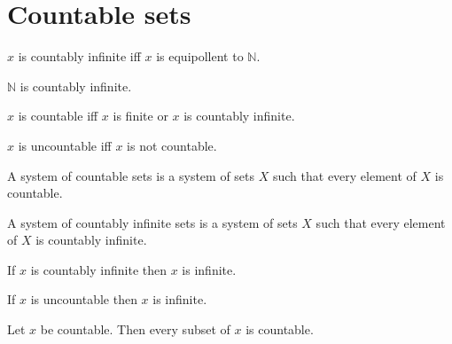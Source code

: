 \documentclass[../../basic-notions.ftl.tex]{subfiles}
\begin{document}


  \section{Countable sets}

  \begin{forthel}
    \begin{definition}
      $x$ is countably infinite iff $x$ is equipollent to $\mathbb{N}$.
    \end{definition}

    \begin{proposition}
      $\mathbb{N}$ is countably infinite.
    \end{proposition}

    \begin{definition}
      $x$ is countable iff $x$ is finite or $x$ is countably infinite.
    \end{definition}

    \begin{definition}
      $x$ is uncountable iff $x$ is not countable.
    \end{definition}

    \begin{definition}
      A system of countable sets is a system of sets $X$ such that every element of $X$ is countable.
    \end{definition}

    \begin{definition}
      A system of countably infinite sets is a system of sets $X$ such that every element of $X$ is countably infinite.
    \end{definition}

    \begin{proposition}[6064894556241920]
      If $x$ is countably infinite then $x$ is infinite.
    \end{proposition}

    \begin{proposition}[4210470751830016]
      If $x$ is uncountable then $x$ is infinite.
    \end{proposition}

    \begin{proposition}[5760763624947712]
      Let $x$ be countable.
      Then every subset of $x$ is countable.
    \end{proposition}


\end{forthel}
\end{document}
